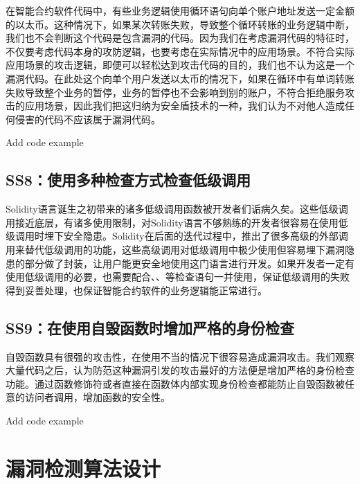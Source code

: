 在智能合约软件代码中，有些业务逻辑使用循环语句向单个账户地址发送一定金额的以太币。这种情况下，如果某次转账失败，导致整个循环转账的业务逻辑中断，我们也不会判断这个代码是包含漏洞的代码。因为我们在考虑漏洞代码的特征时，不仅要考虑代码本身的攻防逻辑，也要考虑在实际情况中的应用场景。不符合实际应用场景的攻击逻辑，即便可以轻松达到攻击代码的目的，我们也不认为这是一个漏洞代码。在此处这个向单个用户发送以太币的情况下，如果在循环中有单词转账失败导致整个业务的暂停，业务的暂停也不会影响到别的账户，不符合拒绝服务攻击的应用场景，因此我们把这归纳为安全盾技术的一种，我们认为不对他人造成任何侵害的代码不应该属于漏洞代码。

\textcolor[rgb]{1.00,0.00,0.00}{Add code example}

\subsection{SS8：使用多种检查方式检查低级调用}

Solidity语言诞生之初带来的诸多低级调用函数被开发者们诟病久矣。这些低级调用接近底层，有诸多使用限制，对Solidity语言不够熟练的开发者很容易在使用低级调用时埋下安全隐患。Solidity在后面的迭代过程中，推出了很多高级的外部调用来替代低级调用的功能，这些高级调用对低级调用中极少使用但容易埋下漏洞隐患的部分做了封装，让用户能更安全地使用这门语言进行开发。如果开发者一定有使用低级调用的必要，也需要配合、、等检查语句一并使用，保证低级调用的失败得到妥善处理，也保证智能合约软件的业务逻辑能正常进行。

\subsection{SS9：在使用自毁函数时增加严格的身份检查}

自毁函数具有很强的攻击性，在使用不当的情况下很容易造成漏洞攻击。我们观察大量代码之后，认为防范这种漏洞引发的攻击最好的方法便是增加严格的身份检查功能。通过函数修饰符或者直接在函数体内部实现身份检查都能防止自毁函数被任意的访问者调用，增加函数的安全性。

\textcolor[rgb]{1.00,0.00,0.00}{Add code example}

\section{漏洞检测算法设计}


